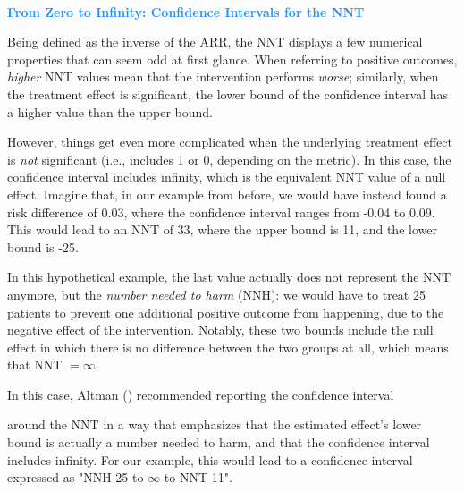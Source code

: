 \begin{box-info} \\
\textcolor{dodgerblue}{\textbf{From Zero to Infinity: Confidence Intervals for the NNT}} 

\vspace{2mm}

Being defined as the inverse of the ARR, the NNT displays a few numerical properties that can seem odd at first glance. When referring to positive outcomes, \emph{higher} NNT values mean that the intervention performs \emph{worse}; similarly, when the treatment effect is significant, the lower bound of the confidence interval has a higher value than the upper bound. 

\vspace{2mm}

\hspace*{5mm} However, things get even more complicated when the underlying treatment effect is \emph{not} significant (i.e., includes 1 or 0, depending on the metric). In this case, the confidence interval includes infinity, which is the equivalent NNT value of a null effect. Imagine that, in our example from before, we would have instead found a risk difference of 0.03, where the confidence interval ranges from -0.04 to 0.09. This would lead to an NNT of 33, where the upper bound is 11, and the lower bound is -25. 

\vspace{2mm}

\hspace*{5mm} In this hypothetical example, the last value actually does not represent the NNT anymore, but the \emph{number needed to harm} (NNH): we would have to treat 25 patients to prevent one additional positive outcome from happening, due to the negative effect of the intervention. Notably, these two bounds include the null effect in which there is no difference between the two groups at all, which means that NNT $=\infty$.

\vspace{2mm}

\hspace*{5mm} In this case, Altman (\citeyear{altman1998confidence}) recommended reporting the confidence interval

\end{box-info}
\begin{box-info-continued}

around the NNT in a way that emphasizes that the estimated effect's lower bound is actually a number needed to harm, and that the confidence interval includes infinity. For our example, this would lead to a confidence interval expressed as "NNH 25 to $\infty$ to NNT 11".

\end{box-info-continued}


